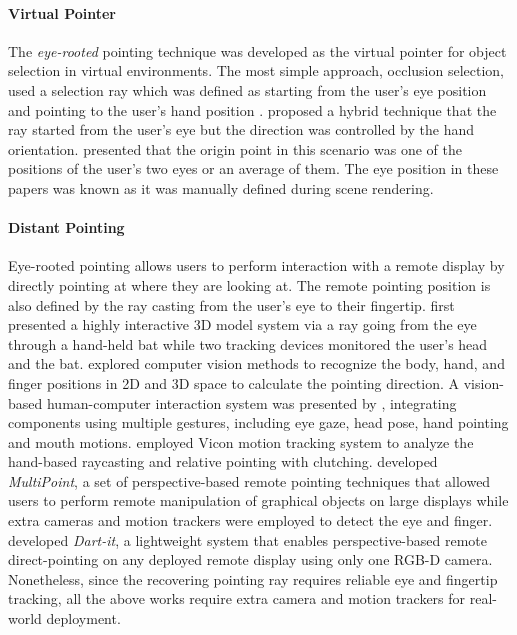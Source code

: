 \paragraph{Virtual Pointer} The \textit{eye-rooted} pointing technique was developed as the virtual pointer for object selection in virtual environments.
The most simple approach, occlusion selection, used a selection ray which was defined as starting from the user's eye position and pointing to the user's hand position \citep{Forsberg1996,Pierce1997}.
\citet{Argelaguet2008} proposed a hybrid technique that the ray started from the user's eye but the direction was controlled by the hand orientation. 
\citet{Forsberg1996} presented that the origin point in this scenario was one of the positions of the user's two eyes or an average of them. 
The eye position in these papers was known as it was manually defined during scene rendering. 

\paragraph{Distant Pointing} Eye-rooted pointing allows users to perform interaction with a remote display by directly pointing at where they are looking at. The remote pointing position is also defined by the ray casting from the user's eye to their fingertip. 
\citet*{Liang1994} first presented a highly interactive 3D model system via a ray going from the eye through a hand-held bat while two tracking devices monitored the user's head and the bat.
\citet{Nickel2003} explored computer vision methods to recognize the body, hand, and finger positions in 2D and 3D space to calculate the pointing direction.
A vision-based human-computer interaction system was presented by \citet{Reale2011}, integrating components using multiple gestures, including eye gaze, head pose, hand pointing and mouth motions.
\citet*{Vogel2005} employed Vicon motion tracking system to analyze the hand-based raycasting and relative pointing with clutching.
\citet{Banerjee2012} developed \textit{MultiPoint}, a set of perspective-based remote pointing techniques that allowed users to perform remote manipulation of graphical objects on large displays while extra cameras and motion trackers were employed to detect the eye and finger.
\citet{Huang2014} developed \textit{Dart-it}, a lightweight system that enables perspective-based remote direct-pointing on any deployed remote display using only one RGB-D camera. 
Nonetheless, since the recovering pointing ray requires reliable eye and fingertip tracking, all the above works require extra camera and motion trackers for real-world deployment.

